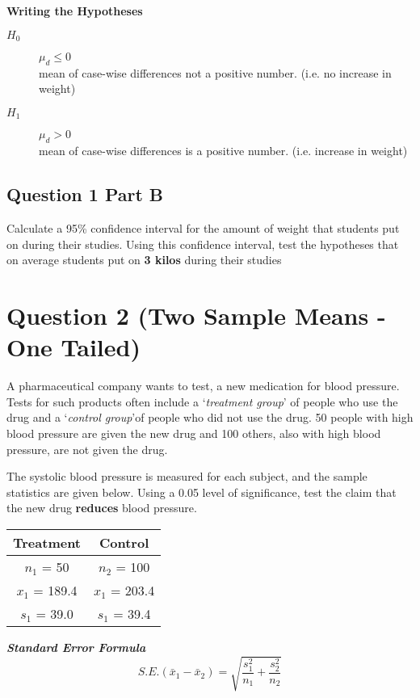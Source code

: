 \documentclass[a4paper,12pt]{article}
\begin{document}
\noindent \textbf{Writing the Hypotheses}
\begin{description}
\item[$H_0$] $\mu_d \leq 0$ \\mean of case-wise differences not a positive number. (i.e. no increase in weight)
\item[$H_1$] $\mu_d > 0$ \\mean of case-wise differences is a positive number. (i.e. increase in weight)
\end{description}


\subsection*{Question 1 Part B}
Calculate a 95\% confidence interval for the amount of weight that students put on during their studies. Using this confidence interval, test the hypotheses that on average students put on \textbf{3 kilos} during their studies


\section*{Question 2 (Two Sample Means - One Tailed)}
A pharmaceutical company wants to test, a new medication for blood pressure. Tests
for such products often include a `\textit{treatment group}' of people who use the drug and a `\textit{control group}'of people who did not use the drug. 50 people with high blood pressure are given the new drug and 100 others, also with high blood pressure, are not given the drug. 

The systolic blood pressure is measured for each subject, and the sample statistics
are given below. Using a 0.05 level of significance, test the claim that the new drug \textbf{reduces}
blood pressure. 
\begin{center}
\begin{tabular}{|c||c|}
\hline 
Treatment & Control \\ \hline \hline
$n_1$ = 50 & $n_2$ = 100 \\ \hline
$x_1$ = 189.4  & $x_1$ = 203.4  \\ \hline
$s_1$ = 39.0 & $s_1$ = 39.4 \\ \hline
\end{tabular} 
\end{center}
\textbf{\textit{Standard Error Formula}}
\[ S.E.(\bar{x}_1 - \bar{x}_2)  = \sqrt{\frac{s_1^2}{n_1} + \frac{s_2^2}{n_2}} \]
\end{document}
